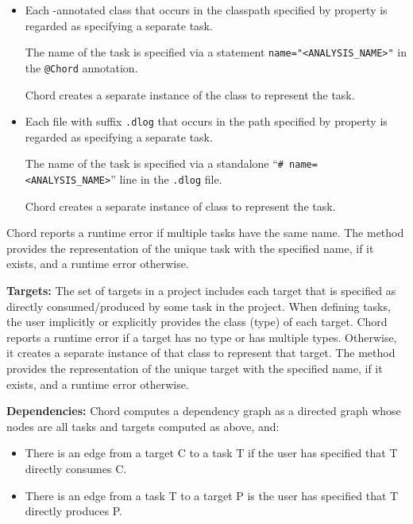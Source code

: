 \begin{itemize}

\item

Each -annotated class that
occurs in the classpath specified by property  is
regarded as specifying a separate task.

The name of the task is specified via a statement
\verb+name="<ANALYSIS_NAME>"+ in the {\tt @Chord} annotation.

Chord creates a separate instance of the class to represent the task.

\item

Each file with suffix {\tt .dlog} that occurs in the path specified by
property  is regarded as specifying a separate task.

The name of the task is specified via a standalone ``\verb+# name=<ANALYSIS_NAME>+'' line in the
{\tt .dlog} file.

Chord creates a separate instance of class
to represent the task.
\end{itemize}

Chord reports a runtime error if multiple tasks have the same name.  The 
method provides the representation of the unique task with the specified name, if it exists,
and a runtime error otherwise.


{\bf Targets:}
The set of targets in a project includes each target that is specified as directly
consumed/produced by some task in the project.  When defining tasks, the user implicitly or
explicitly provides the class (type) of each target.
Chord reports a runtime error if a target has no type or has multiple types.
Otherwise, it creates a separate instance of that class to represent that target.
The  method provides the representation of the unique
target with the specified name, if it exists, and a runtime error otherwise.

{\bf Dependencies:}
Chord computes a dependency graph as a directed graph whose
nodes are all tasks and targets computed as above, and:
\begin{itemize}
\item
There is an edge from a target C to a task T if the user has specified that T
directly consumes C.
\item
There is an edge from a task T to a target P is the user has specified that T
directly produces P.
\end{itemize}

